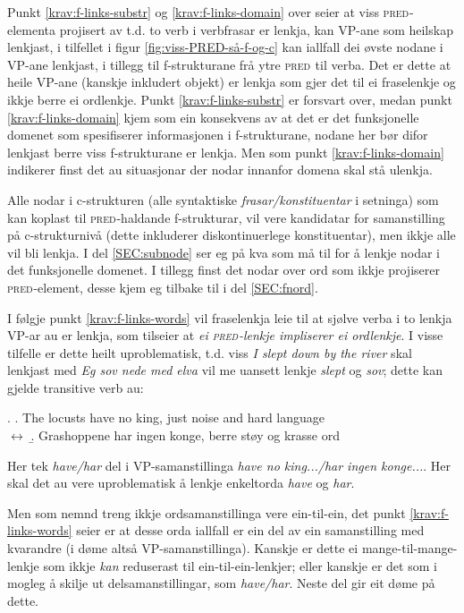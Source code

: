 \documentclass[12pt,a4paper,oneside,draft]{report}
\newcommand{\F}[2]{\textsc{#1}\ensuremath{_{#2}}}
\newcommand{\PRED}{\F{pred}{}}
\begin{document}
Punkt \ref{krav:f-links-substr} og \ref{krav:f-links-domain} over seier at viss
\PRED{}-elementa projisert av t.d. to verb i verbfrasar er lenkja, kan
VP-ane som heilskap lenkjast, i tilfellet i figur
\ref{fig:viss-PRED-så-f-og-c} kan iallfall dei øvste nodane i VP-ane
lenkjast, i tillegg til f-strukturane frå ytre \PRED{} til verba.  Det er
dette at heile VP-ane (kanskje inkludert objekt) er lenkja som gjer
det til ei fraselenkje og ikkje berre ei ordlenkje. Punkt
\ref{krav:f-links-substr} er forsvart over, medan punkt
\ref{krav:f-links-domain} kjem som ein konsekvens av at det er det
funksjonelle domenet som spesifiserer informasjonen i f-strukturane,
nodane her bør difor lenkjast berre viss f-strukturane er lenkja. Men
som punkt \ref{krav:f-links-domain} indikerer finst det au situasjonar der
nodar innanfor domena skal stå ulenkja.

Alle nodar i c-strukturen (alle syntaktiske \emph{frasar/konstituentar} i
setninga) som kan koplast til \PRED{}-haldande f-strukturar, vil vere
kandidatar for samanstilling på c-strukturnivå (dette inkluderer
diskontinuerlege konstituentar), men ikkje alle vil bli lenkja.  I del
\ref{SEC:subnode} ser eg på kva som må til for å lenkje nodar i det
funksjonelle domenet.  I tillegg finst det nodar over ord som ikkje
projiserer \PRED{}-element, desse kjem eg tilbake til i del
\ref{SEC:fnord}.

I følgje punkt \ref{krav:f-links-words} vil fraselenkja leie til at sjølve
verba i to lenkja VP-ar au er lenkja, som tilseier at \emph{ei \PRED{}-lenkje
impliserer ei ordlenkje}. I visse tilfelle er dette heilt
uproblematisk, t.d. viss \emph{I slept down by the river} skal lenkjast med
\emph{Eg sov nede med elva} vil me uansett lenkje \emph{slept} og \emph{sov}; dette
kan gjelde transitive verb au:

\ex. \a. The locusts have no king, just noise and hard language\\
     $\leftrightarrow$
     \b. Grashoppene har ingen konge, berre støy og krasse ord


Her tek \emph{have/har} del i VP-samanstillinga \emph{have no king.../har
 ingen konge...}. Her skal det au vere uproblematisk å lenkje
 enkeltorda \emph{have} og \emph{har}.

Men som nemnd treng ikkje ordsamanstillinga vere ein-til-ein, det
 punkt \ref{krav:f-links-words} seier er at desse orda iallfall er ein
 del av ein samanstilling med kvarandre (i døme \Last altså
 VP-samanstillinga). Kanskje er dette ei mange-til-mange-lenkje som
 ikkje \emph{kan} reduserast til ein-til-ein-lenkjer; eller kanskje er
 det som i \Last mogleg å skilje ut delsamanstillingar, som
 \emph{have/har}. Neste del gir eit døme på dette.
\end{document}
